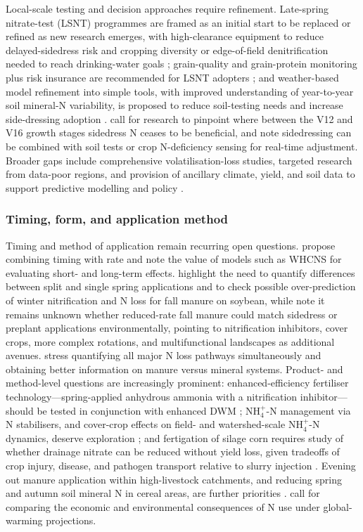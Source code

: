 \documentclass[11pt]{article}
\begin{document}
Local-scale testing and decision approaches require refinement. Late-spring nitrate-test (LSNT) programmes are framed as an initial start to be replaced or refined as new research emerges, with high-clearance equipment to reduce delayed-sidedress risk and cropping diversity or edge-of-field denitrification needed to reach drinking-water goals \parencite{Jaynes2004}; grain-quality and grain-protein monitoring plus risk insurance are recommended for LSNT adopters \parencite{Karlen2005}; and weather-based model refinement into simple tools, with improved understanding of year-to-year soil mineral-N variability, is proposed to reduce soil-testing needs and increase side-dressing adoption \parencite{Malone2010}. \textcite{Jaynes2013} call for research to pinpoint where between the V12 and V16 growth stages sidedress N ceases to be beneficial, and \textcite{Jaynes2015} note sidedressing can be combined with soil tests or crop N-deficiency sensing for real-time adjustment. Broader gaps include comprehensive volatilisation-loss studies, targeted research from data-poor regions, and provision of ancillary climate, yield, and soil data to support predictive modelling and policy \parencite{Chatterjee2020b}.

\subsubsection{Timing, form, and application method}

Timing and method of application remain recurring open questions. \textcite{Liang2018} propose combining timing with rate and note the value of models such as WHCNS for evaluating short- and long-term effects. \textcite{Malone2007b} highlight the need to quantify differences between split and single spring applications and to check possible over-prediction of winter nitrification and N loss for fall manure on soybean, while \textcite{HernandezRamirez2011} note it remains unknown whether reduced-rate fall manure could match sidedress or preplant applications environmentally, pointing to nitrification inhibitors, cover crops, more complex rotations, and multifunctional landscapes as additional avenues. \textcite{Elmi2005} stress quantifying all major N loss pathways simultaneously and obtaining better information on manure versus mineral systems. Product- and method-level questions are increasingly prominent: enhanced-efficiency fertiliser technology---spring-applied anhydrous ammonia with a nitrification inhibitor---should be tested in conjunction with enhanced DWM \parencite{Kaur2024c}; NH$_4^+$-N management via N stabilisers, and cover-crop effects on field- and watershed-scale NH$_4^+$-N dynamics, deserve exploration \parencite{Vincent2025}; and fertigation of silage corn requires study of whether drainage nitrate can be reduced without yield loss, given tradeoffs of crop injury, disease, and pathogen transport relative to slurry injection \parencite{Gamble2018}. Evening out manure application within high-livestock catchments, and reducing spring and autumn soil mineral N in cereal areas, are further priorities \parencite{Bechmann2014}. \textcite{Haghnazari2020} call for comparing the economic and environmental consequences of N use under global-warming projections.
\end{document}
